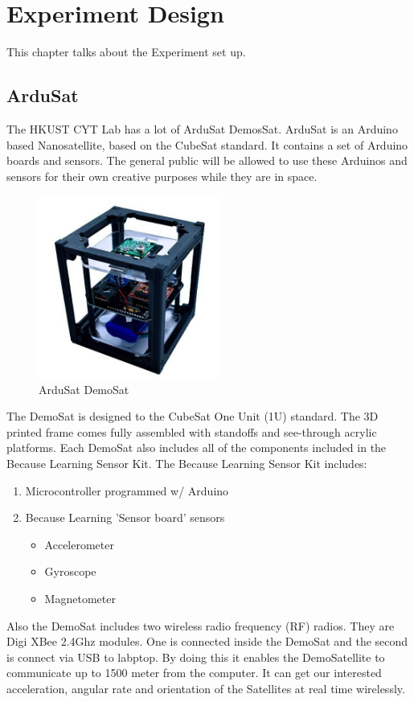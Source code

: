 \chapter{Experiment Design}\label{sec-DOE}
This chapter talks about the Experiment set up.
\section{ArduSat}
The HKUST CYT Lab has a lot of ArduSat DemosSat. ArduSat is an Arduino based Nanosatellite, based on the CubeSat standard. It contains a set of Arduino boards and sensors. The general public will be allowed to use these Arduinos and sensors for their own creative purposes while they are in space. 
\begin{figure}
\centering
\includegraphics[width=6cm]{fig/DOE/Demosat}
\caption{ArduSat DemoSat}
\end{figure}
The DemoSat is designed to the CubeSat One Unit (1U) standard. The 3D printed frame comes fully assembled with standoffs and see-through acrylic platforms. Each DemoSat also includes all of the components included in the Because Learning Sensor Kit. The Because Learning Sensor Kit includes:
\begin{enumerate}
\item Microcontroller programmed w/ Arduino 
\item Because Learning 'Sensor board' sensors 
\begin{itemize}
\item Accelerometer
\item Gyroscope
\item Magnetometer
\end{itemize}
\end{enumerate} 
Also the DemoSat includes two wireless radio frequency (RF) radios. They are Digi XBee 2.4Ghz modules. One is connected inside the DemoSat and the second is connect via USB to labptop. By doing this it enables the DemoSatellite to communicate up to 1500 meter from the computer.
It can get our interested acceleration, angular rate and orientation of the Satellites at real time wirelessly.
